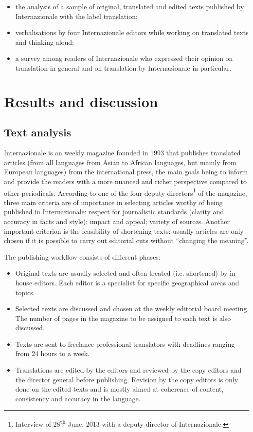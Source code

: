 \documentclass[output=paper]{LSP/langsci}
\begin{document}
\begin{itemize}
 \item the analysis of a sample of original, translated and edited texts published by Internazionale with the label translation;
 \item verbalisations by four Internazionale editors while working on translated texts and thinking aloud;
 \item a survey among readers of Internazionale who expressed their opinion on translation in general and on translation by Internazionale in particular. 
\end{itemize}


\section{Results and discussion}

\subsection{Text analysis}\label{troqe-marchan:sec:a} %

Internazionale is an  weekly magazine founded in 1993 that publishes %
translated articles (from all languages from Asian to African languages, but mainly from European languages) from the international press, the main goals being to inform and provide the readers with a more nuanced and richer perspective compared to other  periodicals. According to one of the four deputy directors\footnote{Interview of 28\textsuperscript{th} June, 2013 with a deputy director of Internazionale.}  of the magazine, three main criteria are of importance in selecting articles worthy of being published in Internazionale: respect for journalistic standards (clarity and accuracy in facts and style); impact and appeal; variety of sources. Another important criterion is the feasibility of shortening texts: usually articles are only chosen if it is possible to carry out editorial cuts without ``changing the meaning''. 

The publishing workflow consists of different phases: 

\begin{itemize}
 \item Original texts are usually selected and often treated (i.e. shortened) by in-house editors. Each editor is a specialist for specific geographical areas and topics.
 \item Selected texts are discussed and chosen at the weekly editorial board meeting. The number of pages in the magazine to be assigned to each text is also discussed.
 \item Texts are sent to freelance professional translators with deadlines ranging from 24 hours to a week.
 \item Translations are edited by the editors and reviewed by the copy editors and the director general before publishing. Revision by the copy editors is only done on the edited texts and is mostly aimed at coherence of content, consistency and accuracy in the  language. 
\end{itemize}
\end{document}
